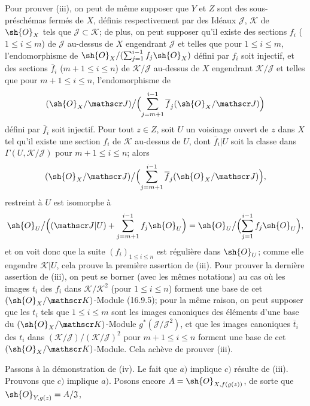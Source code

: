 Pour prouver (iii), on peut de même supposer que $Y$ et $Z$ sont des sous-préschémas fermés de $X$, définis respectivement par des Idéaux $\mathscr J$, $\mathscr K$ de $\sh{O}_X$ tels que $\mathscr J\subset\mathscr K$; de plus, on peut supposer qu'il existe des sections $f_i$ ($1\leq i\leq m$) de $\mathscr J$ au-dessus de $X$ engendrant $\mathscr J$ et telles que pour $1\leq i\leq m$, l'endomorphisme de $\sh{O}_X/(\sum_{j=1}^{i-1}f_j\sh{O}_X)$ défini par $f_i$ soit injectif, et des sections $\overline f_i$ ($m+1\leq i\leq n$) de $\mathscr K/\mathscr J$ au-dessus de $X$ engendrant $\mathscr K/\mathscr J$ et telles que pour $m+1\leq i\leq n$, l'endomorphisme de
\[
  (\sh{O}_X/\mathscr J)\big/\Bigl(\sum_{j=m+1}^{i-1}\overline f_j(\sh{O}_X/\mathscr J)\Bigr)
\]
défini par $\overline f_i$ soit injectif. Pour tout $z\in Z$, soit $U$ un voisinage ouvert de $z$ dans $X$ tel qu'il existe une section $f_i$ de $\mathscr K$ au-dessus de $U$, dont $\overline f_i|U$ soit la classe dans $\Gamma(U,\mathscr K/\mathscr J)$ pour $m+1\leq i\leq n$; alors
\[
  (\sh{O}_X/\mathscr J)\big/\Bigl(\sum_{j=m+1}^{i-1}\overline f_j(\sh{O}_X/\mathscr J)\Bigr),
\]
restreint à $U$ est isomorphe à
\[
  \sh{O}_U\big/\Bigl((\mathscr J|U)+\sum_{j=m+1}^{i-1}f_j\sh{O}_U\Bigr)
  =\sh{O}_U\big/\Bigl(\sum_{j=1}^{i-1}f_j\sh{O}_U\Bigr),
\]
et on voit donc que la suite $(f_i)_{1\leq i\leq n}$ est régulière dans $\sh{O}_U$; comme elle engendre $\mathscr K|U$, cela prouve la première assertion de (iii). Pour prouver la dernière assertion de (iii), on peut se borner (avec les mêmes notations) au cas où les images $t_i$ des $f_i$ dans $\mathscr K/\mathscr K^2$ (pour $1\leq i\leq n$) forment une base de cet $(\sh{O}_X/\mathscr K)$-Module (16.9.5); pour la même raison, on peut supposer que les $t_i$ tels que $1\leq i\leq m$ sont les images canoniques des éléments d'une base du $(\sh{O}_X/\mathscr K)$-Module $g^*(\mathscr J/\mathscr J^2)$, et que les images canoniques $\overline t_i$ des $t_i$ dans $(\mathscr K/\mathscr J)/(\mathscr K/\mathscr J)^2$ pour $m+1\leq i\leq n$ forment une base de cet $(\sh{O}_X/\mathscr K)$-Module. Cela achève de prouver (iii).

Passons à la démonstration de (iv). Le fait que $a)$ implique $c)$ résulte de (iii). Prouvons que $c)$ implique $a)$. Posons encore $A=\sh{O}_{X,f(g(z))}$, de sorte que $\sh{O}_{Y,g(z)}=A/\mathfrak J$,



